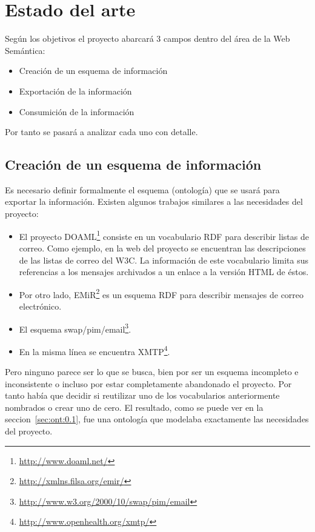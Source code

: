 
\section{Estado del arte}

Según los objetivos el proyecto abarcará 3 campos dentro del área de la
Web Semántica:

\begin{itemize}
 \item Creación de un esquema de información
 \item Exportación de la información
 \item Consumición de la información
\end{itemize}

Por tanto se pasará a analizar cada uno con detalle.

\subsection{Creación de un esquema de información}

Es necesario definir formalmente el esquema (ontología) que se usará para
exportar la información. Existen algunos trabajos similares a las necesidades 
del proyecto:

\begin{itemize}
  \item El proyecto DOAML\footnote{\url{http://www.doaml.net/}} consiste en un 
	vocabulario RDF para describir listas de correo. Como ejemplo, en 
	la web del proyecto se encuentran las descripciones de las listas 
	de correo del W3C. La información de este vocabulario limita sus 
	referencias a los mensajes archivados a un enlace a la versión HTML 
	de éstos.
  \item Por otro lado, EMiR\footnote{\url{http://xmlns.filsa.org/emir/}} es un 
	esquema RDF para describir mensajes de correo electrónico. 
  \item El esquema swap/pim/email\footnote{\url{http://www.w3.org/2000/10/swap/pim/email}}.
  \item En la misma línea se encuentra XMTP\footnote{\url{http://www.openhealth.org/xmtp/}}.
\end{itemize}

Pero ninguno parece ser lo que se busca, bien por ser un esquema incompleto e
inconsistente o incluso por estar completamente abandonado el proyecto. Por 
tanto había que decidir si reutilizar uno de los vocabularios anteriormente
nombrados o crear uno de cero. El resultado, como se puede ver en la
seccion~\ref{sec:ont:0.1}, fue una ontología que modelaba exactamente las
necesidades del proyecto.

